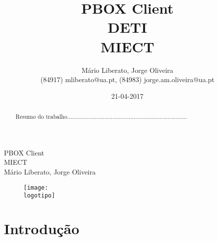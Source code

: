 \documentclass{report}
\begin{document}
%
%
\def\titulo{PBOX Client}
\def\data{21-04-2017}
\def\autores{Mário Liberato, Jorge Oliveira}
\def\autorescontactos{(84917) mliberato@ua.pt, (84983) jorge.am.oliveira@ua.pt}
\def\departamento{DETI}
\def\curso{MIECT}
\def\logotipo{ua.pdf}
%
%
\begin{titlepage}

\begin{center}
%
\vspace*{50mm}
%
{\Huge \titulo}\\ 
%
\vspace{10mm}
%
{\Large \curso}\\
%
\vspace{10mm}
%
{\LARGE \autores}\\ 
%
\vspace{30mm}
%
\begin{figure}[h]
\center
\texttt{[image: \\logotipo]}
\end{figure}
%
\vspace{30mm}
\end{center}
%
\end{titlepage}

\title{%
{\Huge\textbf{\titulo}}\\
{\Large \departamento\\ \curso}
}
%
\author{%
    \autores \\
    \autorescontactos
}
%
\date{\data}
%
\maketitle


\begin{abstract}
Resumo do trabalho..........................................................................
\end{abstract}


\tableofcontents


%
\clearpage
{} %
%
\chapter{Introdução}
\label{chap.introducao} 
\end{document}

